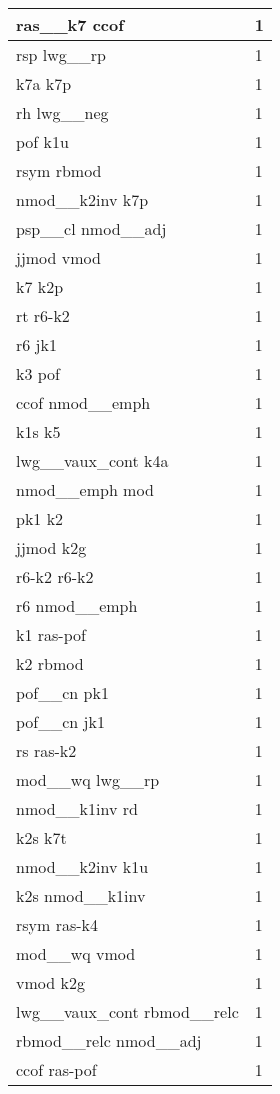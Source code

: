 \documentclass[a4 paper]{article}
\begin{document}
\begin{longtable}{p{}p{}}
ras\_\_k7 ccof  & 1 \\ \midrule
rsp lwg\_\_rp  & 1 \\ \midrule
k7a k7p  & 1 \\ \midrule
rh lwg\_\_neg  & 1 \\ \midrule
pof k1u  & 1 \\ \midrule
rsym rbmod  & 1 \\ \midrule
nmod\_\_k2inv k7p  & 1 \\ \midrule
psp\_\_cl nmod\_\_adj  & 1 \\ \midrule
jjmod vmod  & 1 \\ \midrule
k7 k2p  & 1 \\ \midrule
rt r6-k2  & 1 \\ \midrule
r6 jk1  & 1 \\ \midrule
k3 pof  & 1 \\ \midrule
ccof nmod\_\_emph  & 1 \\ \midrule
k1s k5  & 1 \\ \midrule
lwg\_\_vaux\_cont k4a  & 1 \\ \midrule
nmod\_\_emph mod  & 1 \\ \midrule
pk1 k2  & 1 \\ \midrule
jjmod k2g  & 1 \\ \midrule
r6-k2 r6-k2  & 1 \\ \midrule
r6 nmod\_\_emph  & 1 \\ \midrule
k1 ras-pof  & 1 \\ \midrule
k2 rbmod  & 1 \\ \midrule
pof\_\_cn pk1  & 1 \\ \midrule
pof\_\_cn jk1  & 1 \\ \midrule
rs ras-k2  & 1 \\ \midrule
mod\_\_wq lwg\_\_rp  & 1 \\ \midrule
nmod\_\_k1inv rd  & 1 \\ \midrule
k2s k7t  & 1 \\ \midrule
nmod\_\_k2inv k1u  & 1 \\ \midrule
k2s nmod\_\_k1inv  & 1 \\ \midrule
rsym ras-k4  & 1 \\ \midrule
mod\_\_wq vmod  & 1 \\ \midrule
vmod k2g  & 1 \\ \midrule
lwg\_\_vaux\_cont rbmod\_\_relc  & 1 \\ \midrule
rbmod\_\_relc nmod\_\_adj  & 1 \\ \midrule
ccof ras-pof  & 1 \\ \midrule

\end{longtable}
\end{document}
